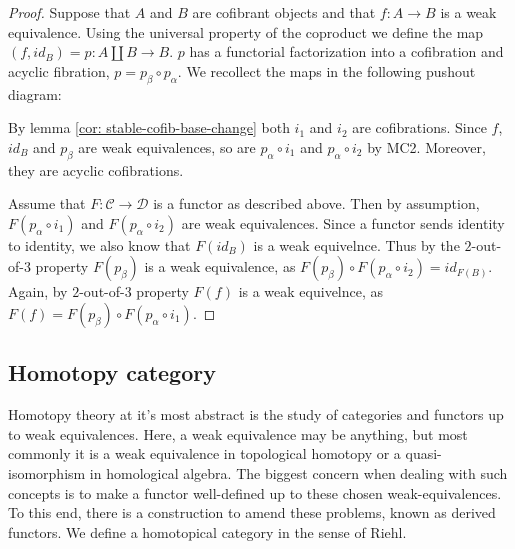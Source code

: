 \documentclass[../thesis.tex]{subfiles}
\begin{document}
            \begin{proof}
                Suppose that $A$ and $B$ are cofibrant objects and that $f:A\rightarrow B$ is a weak equivalence. Using the universal property of the coproduct we define the map $(f, id_B) = p: A\coprod B \rightarrow B$. $p$ has a functorial factorization into a cofibration and acyclic fibration, $p = p_\beta\circ p_\alpha$. We recollect the maps in the following pushout diagram:
                \begin{center}
                \end{center}
                By lemma \ref{cor: stable-cofib-base-change} both $i_1$ and $i_2$ are cofibrations. Since $f$, $id_B$ and $p_\beta$ are weak equivalences, so are $p_\alpha\circ i_1$ and $p_\alpha\circ i_2$ by MC2. Moreover, they are acyclic cofibrations.

                Assume that $F:\mathcal{C}\rightarrow\mathcal{D}$ is a functor as described above. Then by assumption, $F(p_\alpha\circ i_1)$ and $F(p_\alpha\circ i_2)$ are weak equivalences. Since a functor sends identity to identity, we also know that $F(id_B)$ is a weak equivelnce. Thus by the $2$-out-of-$3$ property $F(p_\beta)$ is a weak equivalence, as $F(p_\beta)\circ F(p_\alpha\circ i_2) = id_{F(B)}$. Again, by $2$-out-of-$3$ property $F(f)$ is a weak equivelnce, as $F(f) = F(p_\beta)\circ F(p_\alpha\circ i_1)$.
            \end{proof}

        \subsection{Homotopy category}

            Homotopy theory at it's most abstract is the study of categories and functors up to weak equivalences. Here, a weak equivalence may be anything, but most commonly it is a weak equivalence in topological homotopy or a quasi-isomorphism in homological algebra. The biggest concern when dealing with such concepts is to make a functor well-defined up to these chosen weak-equivalences. To this end, there is a construction to amend these problems, known as derived functors. We define a homotopical category in the sense of Riehl.
\end{document}
